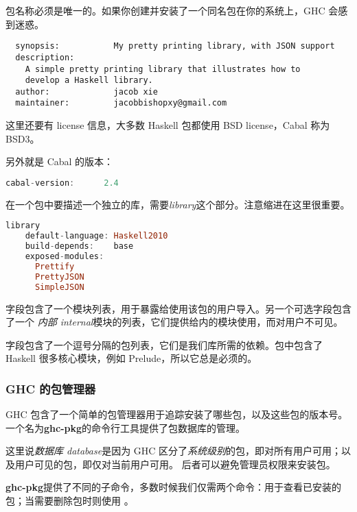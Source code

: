 \documentclass[./main.tex]{subfiles}
\begin{document}
包名称必须是唯一的。如果你创建并安装了一个同名包在你的系统上，GHC 会感到迷惑。

\begin{lstlisting}
  synopsis:           My pretty printing library, with JSON support
  description:
    A simple pretty printing library that illustrates how to
    develop a Haskell library.
  author:             jacob xie
  maintainer:         jacobbishopxy@gmail.com
\end{lstlisting}

这里还要有 license 信息，大多数 Haskell 包都使用 BSD license，Cabal 称为 BSD3。

另外就是 Cabal 的版本：

\begin{lstlisting}[language=Haskell]
  cabal-version:      2.4
\end{lstlisting}

在一个包中要描述一个独立的库，需要\textit{library}这个部分。注意缩进在这里很重要。

\begin{lstlisting}[language=Haskell]
  library
    default-language: Haskell2010
    build-depends:    base
    exposed-modules:
      Prettify
      PrettyJSON
      SimpleJSON
\end{lstlisting}

字段包含了一个模块列表，用于暴露给使用该包的用户导入。另一个可选字段包含了一个
\textit{内部 internal}模块的列表，它们提供给内的模块使用，而对用户不可见。

字段包含了一个逗号分隔的包列表，它们是我们库所需的依赖。包中包含了 Haskell 很多核心模块，例如
Prelude，所以它总是必须的。

\subsubsection*{GHC 的包管理器}

GHC 包含了一个简单的包管理器用于追踪安装了哪些包，以及这些包的版本号。一个名为\textbf{ghc-pkg}的命令行工具提供了包数据库的管理。

这里说\textit{数据库 database}是因为 GHC 区分了\textit{系统级别}的包，即对所有用户可用；以及用户可见的包，即仅对当前用户可用。
后者可以避免管理员权限来安装包。

\textbf{ghc-pkg}提供了不同的子命令，多数时候我们仅需两个命令：用于查看已安装的包；当需要删除包时则使用
。
\end{document}

